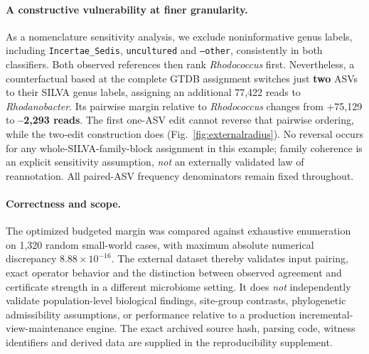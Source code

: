 \paragraph{A constructive vulnerability at finer granularity.}
As a nomenclature sensitivity analysis, we exclude noninformative genus labels, including \texttt{Incertae\_Sedis}, \texttt{uncultured} and \texttt{--other}, consistently in both classifiers. Both observed references then rank \emph{Rhodococcus} first. Nevertheless, a counterfactual based at the complete GTDB assignment switches just \textbf{two} ASVs to their SILVA genus labels, assigning an additional 77,422 reads to \emph{Rhodanobacter}. Its pairwise margin relative to \emph{Rhodococcus} changes from +75,129 to \textbf{--2,293 reads}. The first one-ASV edit cannot reverse that pairwise ordering, while the two-edit construction does (Fig.~\ref{fig:externalradius}). No reversal occurs for any whole-SILVA-family-block assignment in this example; family coherence is an explicit sensitivity assumption, \emph{not} an externally validated law of reannotation. All paired-ASV frequency denominators remain fixed throughout.

\paragraph{Correctness and scope.}
The optimized budgeted margin was compared against exhaustive enumeration on 1,320 random small-world cases, with maximum absolute numerical discrepancy \(8.88\times10^{-16}\). The external dataset thereby validates input pairing, exact operator behavior and the distinction between observed agreement and certificate strength in a different microbiome setting. It does \emph{not} independently validate population-level biological findings, site-group contrasts, phylogenetic admissibility assumptions, or performance relative to a production incremental-view-maintenance engine. The exact archived source hash, parsing code, witness identifiers and derived data are supplied in the reproducibility supplement.

